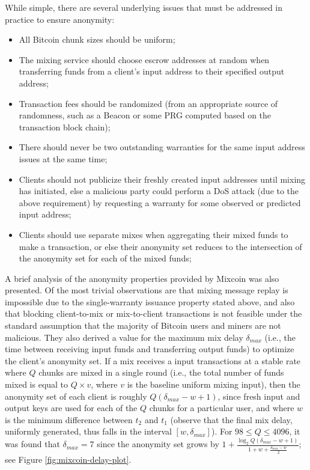 While simple, there are several underlying issues that must be addressed in practice to ensure anonymity:
\begin{itemize}
	\item All Bitcoin chunk sizes should be uniform;
	\item The mixing service should choose escrow addresses at random when transferring funds from a client's input address to their specified output address;
	\item Transaction fees should be randomized (from an appropriate source of randomness, such as a Beacon \cite{nist-beacon} or some PRG computed based on the transaction block chain);
	\item There should never be two outstanding warranties for the same input address issues at the same time;
	\item Clients should not publicize their freshly created input addresses until mixing has initiated, else a malicious party could perform a DoS attack (due to the above requirement) by requesting a warranty for some observed or predicted input address;
	\item Clients should use separate mixes when aggregating their mixed funds to make a transaction, or else their anonymity set reduces to the intersection of the anonymity set for each of the mixed funds;
\end{itemize}

A brief analysis of the anonymity properties provided by Mixcoin was also presented. Of the most trivial observations are that mixing message replay is impossible due to the single-warranty issuance property stated above, and also that blocking client-to-mix or mix-to-client transactions is not feasible under the standard assumption that the majority of Bitcoin users and miners are not malicious. They also derived a value for the maximum mix delay $\delta_{max}$ (i.e., the time between receiving input funds and transferring output funds) to optimize the client's anonymity set. If a mix receives a input transactions at a stable rate where $Q$ chunks are mixed in a single round (i.e., the total number of funds mixed is equal to $Q \times v$, where $v$ is the baseline uniform mixing input), then the anonymity set of each client is roughly $Q(\delta_{max} - w + 1)$, since fresh input and output keys are used for each of the $Q$ chunks for a particular user, and where $w$ is the minimum difference between $t_2$ and $t_1$ (observe that the final mix delay, uniformly generated, thus falls in the interval $[w, \delta_{max}]$). For $98 \leq Q \leq 4096$, it was found that $\delta_{max} = 7$ since the anonymity set grows by $1 + \frac{\log_2Q(\delta_{max} - w + 1)}{1 + w + \frac{\delta_{max} - w}{2}}$; see Figure \ref{fig:mixcoin-delay-plot}.

